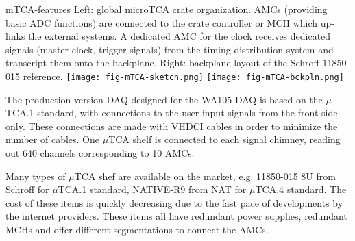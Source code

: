 \begin{cdrfigure}{mTCA-features}
{\small Left: global microTCA crate organization. AMCs 
(providing basic ADC functions) are connected to the crate 
controller or MCH which up-links the external systems. A dedicated 
AMC for the clock receives dedicated signals (master clock, trigger 
signals) from the timing distribution system and transcript them onto 
the backplane. Right: backplane layout of the Schroff 11850-015 reference.}
\texttt{[image: fig-mTCA-sketch.png]}\hfill
\texttt{[image: fig-mTCA-bckpln.png]}
\end{cdrfigure}

The production version DAQ designed for the WA105 DAQ is based on the
$\mu$TCA.1 standard, with connections to the user input signals from 
the front side only. These connections are made with VHDCI
cables in order to minimize the number of cables. One $\mu$TCA shelf
is connected to each signal chimney, reading out 640 channels corresponding to 10 AMCs.


Many types of  $\mu$TCA shef are available on the market, e.g.
11850-015 8U from Schroff for $\mu$TCA.1
standard, NATIVE-R9 from NAT for $\mu$TCA.4 standard. The cost of
these items is quickly decreasing due to the fast pace of
developments by the internet providers. These items all have redundant power
supplies, redundant MCHs and offer different segmentations to connect
the AMCs.



